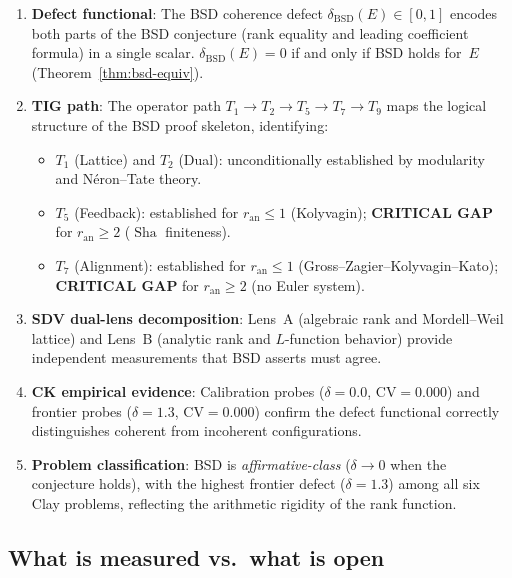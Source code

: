 \documentclass[11pt]{article}
\DeclareMathOperator{\Sha}{Sha}
\begin{document}
\begin{enumerate}
  \item \textbf{Defect functional}: The BSD coherence defect
    $\delta_{\mathrm{BSD}}(E) \in [0,1]$ encodes both parts of the BSD
    conjecture (rank equality and leading coefficient formula) in a single
    scalar.  $\delta_{\mathrm{BSD}}(E) = 0$ if and only if BSD holds for~$E$
    (Theorem~\ref{thm:bsd-equiv}).

  \item \textbf{TIG path}: The operator path
    $T_1 \to T_2 \to T_5 \to T_7 \to T_9$ maps the logical structure of the
    BSD proof skeleton, identifying:
    \begin{itemize}
      \item $T_1$ (Lattice) and $T_2$ (Dual): unconditionally established by
        modularity and N\'eron--Tate theory.
      \item $T_5$ (Feedback): established for $r_{\mathrm{an}} \leq 1$
        (Kolyvagin); \textbf{CRITICAL GAP} for $r_{\mathrm{an}} \geq 2$
        ($\Sha$ finiteness).
      \item $T_7$ (Alignment): established for $r_{\mathrm{an}} \leq 1$
        (Gross--Zagier--Kolyvagin--Kato); \textbf{CRITICAL GAP} for
        $r_{\mathrm{an}} \geq 2$ (no Euler system).
    \end{itemize}

  \item \textbf{SDV dual-lens decomposition}: Lens~A (algebraic rank and
    Mordell--Weil lattice) and Lens~B (analytic rank and $L$-function behavior)
    provide independent measurements that BSD asserts must agree.

  \item \textbf{CK empirical evidence}: Calibration probes
    ($\delta = 0.0$, $\mathrm{CV} = 0.000$) and frontier probes
    ($\delta = 1.3$, $\mathrm{CV} = 0.000$) confirm the defect functional
    correctly distinguishes coherent from incoherent configurations.

  \item \textbf{Problem classification}: BSD is \emph{affirmative-class}
    ($\delta \to 0$ when the conjecture holds), with the highest frontier
    defect ($\delta = 1.3$) among all six Clay problems, reflecting the
    arithmetic rigidity of the rank function.
\end{enumerate}

\subsection{What is measured vs.\ what is open}
\end{document}
